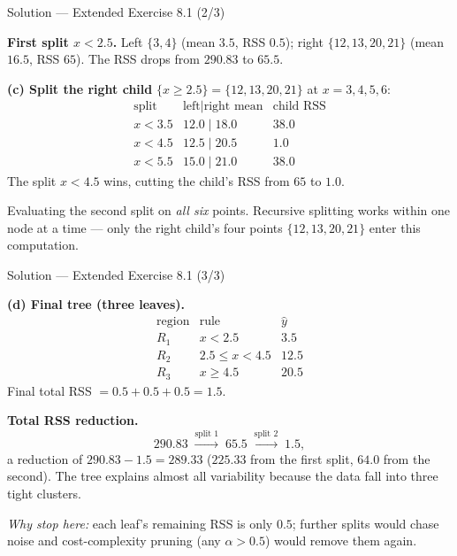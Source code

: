 \documentclass[aspectratio=169,11pt]{beamer}
\begin{document}
\begin{frame}{Solution --- Extended Exercise 8.1 (2/3)}
\begin{solutionbox}
\textbf{First split $x<2.5$.} Left $\{3,4\}$ (mean $3.5$, RSS $0.5$); right $\{12,13,20,21\}$ (mean $16.5$, RSS $65$). The RSS drops from $290.83$ to $65.5$.

\medskip
\textbf{(c) Split the right child} $\{x\ge2.5\}=\{12,13,20,21\}$ at $x=3,4,5,6$:
\[
\begin{array}{c|c|c}
\text{split} & \text{left}\mid\text{right mean} & \text{child RSS}\\\hline
x<3.5 & 12.0\mid18.0 & 38.0\\
x<4.5 & 12.5\mid20.5 & \mathbf{1.0}\\
x<5.5 & 15.0\mid21.0 & 38.0
\end{array}
\]
The split $x<4.5$ wins, cutting the child's RSS from $65$ to $1.0$.
\end{solutionbox}
\begin{mistake}
Evaluating the second split on \emph{all six} points. Recursive splitting works within one node at a time --- only the right child's four points $\{12,13,20,21\}$ enter this computation.
\end{mistake}
\end{frame}

\begin{frame}{Solution --- Extended Exercise 8.1 (3/3)}
\begin{solutionbox}
\textbf{(d) Final tree (three leaves).}
\[
\begin{array}{c|c|c}
\text{region} & \text{rule} & \hat y\\\hline
R_1 & x<2.5 & 3.5\\
R_2 & 2.5\le x<4.5 & 12.5\\
R_3 & x\ge4.5 & 20.5
\end{array}
\]
Final total RSS $=0.5+0.5+0.5=1.5$.

\medskip
\textbf{Total RSS reduction.}
\[ 290.83 \;\xrightarrow{\text{split 1}}\; 65.5 \;\xrightarrow{\text{split 2}}\; 1.5, \]
a reduction of $290.83-1.5=\mathbf{289.33}$ ($225.33$ from the first split, $64.0$ from the second). The tree explains almost all variability because the data fall into three tight clusters.

\medskip
\emph{Why stop here:} each leaf's remaining RSS is only $0.5$; further splits would chase noise and cost-complexity pruning (any $\alpha>0.5$) would remove them again.
\end{solutionbox}
\end{frame}
\end{document}
